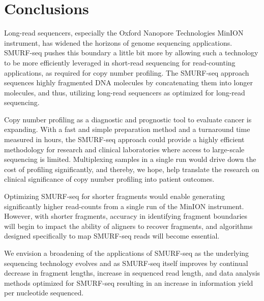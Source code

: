 \chapter{Conclusions}
\label{ch5}

Long-read sequencers, especially the Oxford Nanopore Technologies MinION
instrument, has widened the horizons of genome sequencing applications.
SMURF-seq pushes this boundary a little bit more by allowing such a
technology to be more efficiently leveraged in short-read sequencing for
read-counting applications, as required for copy number profiling.
%
The SMURF-seq approach sequences highly fragmented DNA molecules by
concatenating them into longer molecules, and thus, utilizing long-read
sequencers as optimized for long-read sequencing.

Copy number profiling as a diagnostic and prognostic tool to evaluate
cancer is expanding. With a fast and simple preparation method and a
turnaround time measured in hours, the SMURF-seq approach could provide
a highly efficient methodology for research and clinical laboratories
where access to large-scale sequencing is limited. Multiplexing samples
in a single run would drive down the cost of profiling significantly, and
thereby, we hope, help translate the research on clinical significance of
copy number profiling into patient outcomes.

Optimizing SMURF-seq for shorter fragments would enable generating
significantly higher read-counts from a single run of the MinION
instrument.  However, with shorter fragments, accuracy in identifying
fragment boundaries will begin to impact the ability of aligners to
recover fragments, and algorithms designed specifically to map SMURF-seq
reads will become essential.

We envision a broadening of the applications of SMURF-seq as the
underlying sequencing technology evolves and as SMURF-seq itself
improves by continual decrease in fragment lengths, increase in
sequenced read length, and data analysis methods optimized for SMURF-seq
resulting in an increase in information yield per nucleotide sequenced.
